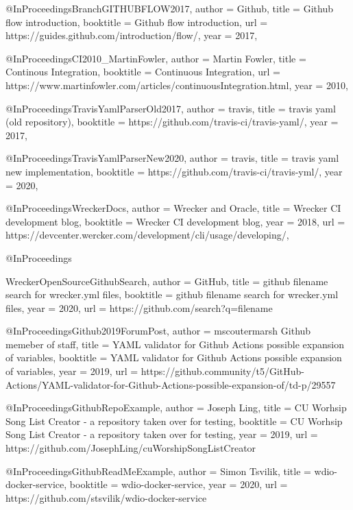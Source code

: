 {{{{{{@InProceedings{BranchGITHUBFLOW2017},
  author    = {Github},
  title     = {Github flow introduction},
  booktitle = {Github flow introduction},
  url = {https://guides.github.com/introduction/flow/},
  year      = {2017},
}

@InProceedings{CI2010_MartinFowler,
  author    = {Martin Fowler},
  title     = {Continous Integration},
  booktitle = {Continuous Integration},
  url = {https://www.martinfowler.com/articles/continuousIntegration.html},
  year      = {2010},
}

@InProceedings{TravisYamlParserOld2017,
  author    = {travis},
  title     = {travis yaml (old repository)},
  booktitle = {https://github.com/travis-ci/travis-yaml/},
  year      = {2017},
}

@InProceedings{TravisYamlParserNew2020,
  author    = {travis},
  title     = {travis yaml new implementation},
  booktitle = {https://github.com/travis-ci/travis-yml/},
  year      = {2020},
}

@InProceedings{WreckerDocs,
  author    = {Wrecker and Oracle},
  title     = {Wrecker CI development blog},
  booktitle = {Wrecker CI development blog},
  year      = {2018},
  url       = {https://devcenter.wercker.com/development/cli/usage/developing/},
}

@InProceedings{WreckerOpenSourceGithubSearch,
  author    = {GitHub},
  title     = {github filename search for wrecker.yml files},
  booktitle = {github filename search for wrecker.yml files},
  year      = {2020},
  url       = {https://github.com/search?q=filename%
}

@InProceedings{Github2019ForumPost,
  author    = {mscoutermarsh Github memeber of staff},
  title     = {YAML validator for Github Actions possible expansion of variables},
  booktitle = {YAML validator for Github Actions possible expansion of variables},
  year      = {2019},
  url       = {https://github.community/t5/GitHub-Actions/YAML-validator-for-Github-Actions-possible-expansion-of/td-p/29557}
}

@InProceedings{GithubRepoExample,
  author    = {Joseph Ling},
  title     = {CU Worhsip Song List Creator - a repository taken over for testing},
  booktitle = {CU Worhsip Song List Creator - a repository taken over for testing},
  year      = {2019},
  url       = {https://github.com/JosephLing/cuWorshipSongListCreator}
}

@InProceedings{GithubReadMeExample,
  author    = {Simon Tsvilik},
  title     = {wdio-docker-service},
  booktitle = {wdio-docker-service},
  year      = {2020},
  url       = {https://github.com/stsvilik/wdio-docker-service}
}


}}}}}}

